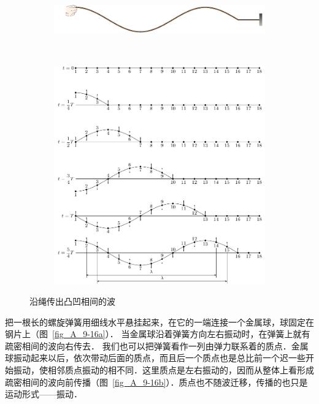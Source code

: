 \begin{figure}[htbp]
    \centering
    \begin{subfigure}{0.8\linewidth}
    	\centering
    	\includegraphics{fig/A/9-15a.pdf}
    	\caption{}\label{fig_A_9-15a}
    \end{subfigure}
    \\
    \begin{subfigure}{0.8\linewidth}
    	\centering
    	\includegraphics{fig/A/9-15b.pdf}
    	\caption{}\label{fig_A_9-15b}
    \end{subfigure}
    \caption{沿绳传出凸凹相间的波}\label{fig_A_9-15}
\end{figure}

把一根长的螺旋弹簧用细线水平悬挂起来，在它的一端连接一个金属球，球固定在钢片上（图~\ref{fig_A_9-16a}）．
当金属球沿着弹簧方向左右振动时，在弹簧上就有疏密相间的波向右传去．
我们也可以把弹簧看作一列由弹力联系着的质点．金属球振动起来以后，依次带动后面的质点，而且后一个质点也是总比前一个迟一些开始振动，使相邻质点振动的相不同．这里质点是左右振动的，因而从整体上看形成疏密相间的波向前传播（图~\ref{fig_A_9-16b}）．质点也不随波迁移，传播的也只是运动形式——振动．

